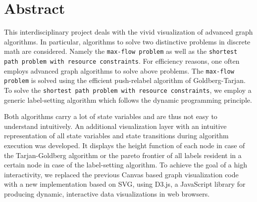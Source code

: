 \cleardoublepage

\section*{Abstract}
This interdisciplinary project deals with the vivid visualization of advanced graph algorithms. In particular, algorithms to solve two distinctive problems in discrete math are considered. Namely the \texttt{max-flow problem} as well as the \texttt{shortest path problem with resource constraints}.
For efficiency reasons, one often employs advanced graph algorithms to solve above problems. The \texttt{max-flow problem} is solved using the efficient push-relabel algorithm of Goldberg-Tarjan. To solve the \texttt{shortest path problem with resource constraints}, we employ a generic label-setting algorithm which follows the dynamic programming principle.


Both algorithms carry a lot of state variables and are thus not easy to understand intuitively. An additional visualization layer with an intuitive representation of all state variables and state transitions during algorithm execution was developed. It displays the height function of each node in case of the Tarjan-Goldberg algorithm or the pareto frontier of all labels resident in a certain node in case of the label-setting algorithm. To achieve the goal of a high interactivity, we replaced the previous Canvas based graph visualization code with a new implementation based on SVG, using D3.js, a JavaScript library for producing dynamic, interactive data visualizations in web browsers.


